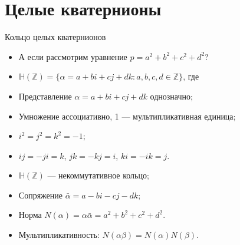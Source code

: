 \documentclass[serif, aspectratio=169]{beamer}
\begin{document}
\section{Целые кватернионы}

\begin{frame}{Кольцо целых кватернионов}
    \begin{itemize}
        \item А если рассмотрим уравнение $p=a^2+b^2+c^2+d^2$?
        \item $\mathbb{H}(\mathbb{Z})=\{\alpha=a+bi+cj+dk : a,b,c,d\in\mathbb{Z}\}$, где
        \item Представление $\alpha=a+bi+cj+dk$ однозначно;
        \item Умножение ассоциативно, 1 --- мультипликативная единица;
        \item $i^2=j^2=k^2=-1$;
        \item $ij=-ji=k$, $jk=-kj=i$, $ki=-ik=j$.
        \item $\mathbb{H}(\mathbb{Z})$ --- некоммутативное кольцо;
        \item Сопряжение $\bar \alpha=a-bi-cj-dk$;
        \item Норма $N(\alpha)=\alpha\bar \alpha=a^2+b^2+c^2+d^2$.
        \item Мультипликативность: $N(\alpha\beta)=N(\alpha)N(\beta)$.
    \end{itemize}
\end{frame}
\end{document}
